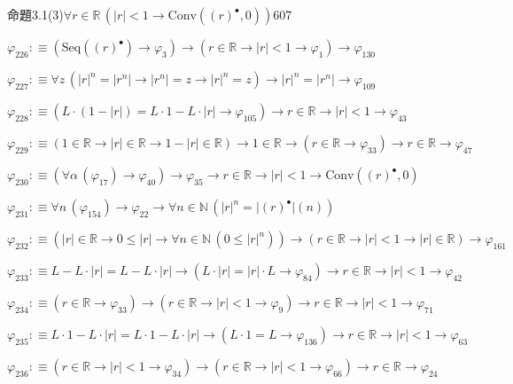 \begin{fullproof}{命題3.1(3)}{$\forall r \in \mathbb{R}\,(\lvert r \rvert < 1 \to \mathrm{Conv}({(r)^{\bullet}},0))$}{607}
\begin{abbrevlist}
\item $\varphi_{226} :\equiv (\mathrm{Seq}({(r)^{\bullet}}) \to \varphi_{3}) \to (r \in \mathbb{R} \to \lvert r \rvert < 1 \to \varphi_{1}) \to \varphi_{130}$
\item $\varphi_{227} :\equiv \forall z\,({{\lvert r \rvert}^{n}} = \lvert {{r}^{n}} \rvert \to \lvert {{r}^{n}} \rvert = z \to {{\lvert r \rvert}^{n}} = z) \to {{\lvert r \rvert}^{n}} = \lvert {{r}^{n}} \rvert \to \varphi_{109}$
\item $\varphi_{228} :\equiv (L \cdot (1 - \lvert r \rvert) = L \cdot 1 - L \cdot \lvert r \rvert \to \varphi_{105}) \to r \in \mathbb{R} \to \lvert r \rvert < 1 \to \varphi_{43}$
\item $\varphi_{229} :\equiv (1 \in \mathbb{R} \to \lvert r \rvert \in \mathbb{R} \to 1 - \lvert r \rvert \in \mathbb{R}) \to 1 \in \mathbb{R} \to (r \in \mathbb{R} \to \varphi_{33}) \to r \in \mathbb{R} \to \varphi_{47}$
\item $\varphi_{230} :\equiv (\forall \alpha\,(\varphi_{17}) \to \varphi_{40}) \to \varphi_{35} \to r \in \mathbb{R} \to \lvert r \rvert < 1 \to \mathrm{Conv}({(r)^{\bullet}},0)$
\item $\varphi_{231} :\equiv \forall n\,(\varphi_{154}) \to \varphi_{22} \to \forall n \in \mathbb{N}\,({{\lvert r \rvert}^{n}} = \lvert {(r)^{\bullet}} \rvert(n))$
\item $\varphi_{232} :\equiv (\lvert r \rvert \in \mathbb{R} \to 0 \leq \lvert r \rvert \to \forall n \in \mathbb{N}\,(0 \leq {{\lvert r \rvert}^{n}})) \to (r \in \mathbb{R} \to \lvert r \rvert < 1 \to \lvert r \rvert \in \mathbb{R}) \to \varphi_{161}$
\item $\varphi_{233} :\equiv L - L \cdot \lvert r \rvert = L - L \cdot \lvert r \rvert \to (L \cdot \lvert r \rvert = \lvert r \rvert \cdot L \to \varphi_{84}) \to r \in \mathbb{R} \to \lvert r \rvert < 1 \to \varphi_{42}$
\item $\varphi_{234} :\equiv (r \in \mathbb{R} \to \varphi_{33}) \to (r \in \mathbb{R} \to \lvert r \rvert < 1 \to \varphi_{9}) \to r \in \mathbb{R} \to \lvert r \rvert < 1 \to \varphi_{71}$
\item $\varphi_{235} :\equiv L \cdot 1 - L \cdot \lvert r \rvert = L \cdot 1 - L \cdot \lvert r \rvert \to (L \cdot 1 = L \to \varphi_{136}) \to r \in \mathbb{R} \to \lvert r \rvert < 1 \to \varphi_{63}$
\item $\varphi_{236} :\equiv (r \in \mathbb{R} \to \lvert r \rvert < 1 \to \varphi_{34}) \to (r \in \mathbb{R} \to \lvert r \rvert < 1 \to \varphi_{66}) \to r \in \mathbb{R} \to \varphi_{24}$

\end{abbrevlist}
\end{fullproof}
